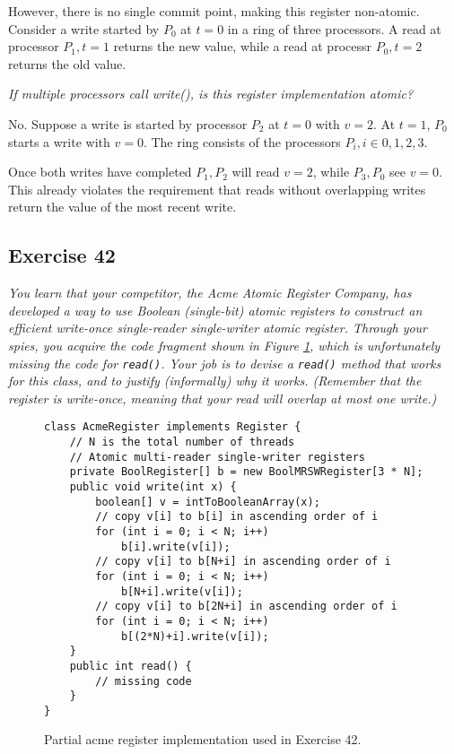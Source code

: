 \documentclass[a4paper,10pt]{article}
\begin{document}
However, there is no single commit point, making this register non-atomic. Consider
a write started by $P_0$ at $t = 0$ in a ring
of three processors. A read at processor $P_1, t = 1$ returns the new value,
while a read at processr $P_0, t = 2$ returns the old value.

\vspace{3mm}

\emph{If multiple processors call write(), is this register implementation atomic?}

\vspace{3mm}

No. Suppose a write is started by processor $P_2$ at $t = 0$ with $v = 2$. At
$t = 1$, $P_0$ starts a write with $v = 0$. The ring consists of the processors $P_i, i \in 0, 1, 2, 3$.

Once both writes have completed $P_1, P_2$ will read $v = 2$, while $P_3, P_0$ 
see $v = 0$. This already violates the requirement that reads without overlapping
writes return the value of the most recent write.

\subsection{Exercise 42}

\emph{You learn that your competitor, the Acme Atomic Register Company, has 
developed a way to use Boolean (single-bit) atomic registers to construct
an efficient write-once single-reader single-writer atomic register. Through your
spies, you acquire the code fragment shown in Figure \ref{fig:acmeregister}, which is unfortunately
missing the code for \lstinline|read()|. Your job is to devise a \lstinline|read()| method that works for
this class, and to justify (informally) why it works. (Remember that the register is
write-once, meaning that your read will overlap at most one write.)}

\begin{figure}
\begin{lstlisting}
class AcmeRegister implements Register {
    // N is the total number of threads
    // Atomic multi-reader single-writer registers
    private BoolRegister[] b = new BoolMRSWRegister[3 * N];
    public void write(int x) {
        boolean[] v = intToBooleanArray(x);
        // copy v[i] to b[i] in ascending order of i
        for (int i = 0; i < N; i++)
            b[i].write(v[i]);
        // copy v[i] to b[N+i] in ascending order of i
        for (int i = 0; i < N; i++)
            b[N+i].write(v[i]);
        // copy v[i] to b[2N+i] in ascending order of i
        for (int i = 0; i < N; i++)
            b[(2*N)+i].write(v[i]);
    }
    public int read() {
        // missing code
    }
}
\end{lstlisting}
\caption{Partial acme register implementation used in Exercise 42.}
\label{fig:acmeregister}
\end{figure}
\end{document}
